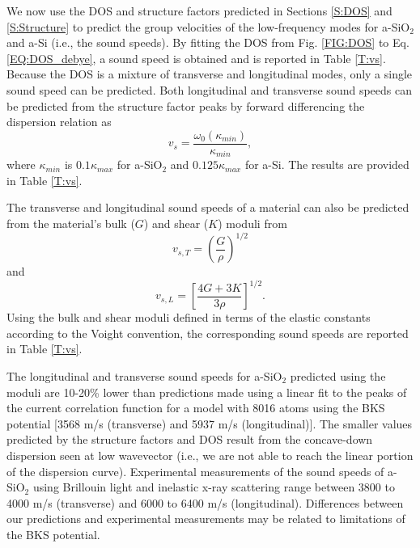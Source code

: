 We now use the DOS and structure factors predicted in
Sections \ref{S:DOS} and \ref{S:Structure} to
predict the group velocities of the low-frequency modes for
a-SiO$_2$ and a-Si (i.e., the sound speeds). By fitting the DOS
from Fig. \ref{FIG:DOS} to Eq. \eqref{EQ:DOS_debye}, 
a sound speed is obtained and is 
reported in Table \ref{T:vs}. Because the DOS is a mixture of
transverse and longitudinal modes, only a single sound speed can be
predicted. 
Both longitudinal and transverse sound speeds can be predicted from
the structure factor peaks by forward differencing the dispersion relation as
\begin{equation}\label{EQ:vs_dwdk}
v_{s} = \frac{\omega_0(\kappa_{min})}{\kappa_{min}},
\end{equation}
where $\kappa_{min}$ is $0.1\kappa_{max}$ for a-SiO$_2$ and 
$0.125\kappa_{max}$ for a-Si. The results are provided in 
Table \ref{T:vs}.

The transverse and longitudinal sound speeds of a material can
also be predicted from the material's bulk ($G$) and
shear ($K$) moduli from\cite{gale_general_2003} 
\begin{equation}\label{EQ:vs_T_elas}
v_{s,T} = \left(\frac{G}{\rho}\right)^{1/2}
\end{equation}
and
\begin{equation}\label{EQ:vs_L_elas}
v_{s,L} = \left[\frac{4G + 3K}{3\rho}\right]^{1/2}.
\end{equation}
Using the bulk and shear moduli defined in terms of the elastic
constants according to the Voight convention,\cite{gale_general_2003} 
the corresponding sound speeds are reported in Table \ref{T:vs}.
 
The longitudinal and transverse sound speeds for 
a-SiO$_2$ predicted using the moduli are 10-20\%  
lower than predictions made using a linear fit to the peaks of the 
current correlation function for a model with 
8016 atoms using the BKS potential 
[3568 m/s (transverse) and 5937 m/s (longitudinal)].
\cite{horbach_high_2001} The smaller 
values predicted by the structure factors and DOS 
result from the concave-down dispersion seen at low 
wavevector (i.e., we are not able to reach 
the linear portion of the dispersion curve).\cite{horbach_high_2001} 
Experimental measurements of the sound speeds of a-SiO$_2$ 
using Brillouin light and inelastic x-ray 
scattering range between 3800 to 4000 m/s (transverse) and 
6000 to 6400 m/s (longitudinal).
\cite{vacher_ultrasonic_1981,benassi_evidence_1996,
ruocco_high-frequency_2001,polian_elastic_2002,
ruzicka_evidence_2004} Differences between our predictions and 
experimental measurements may be related to limitations of the 
BKS potential.

